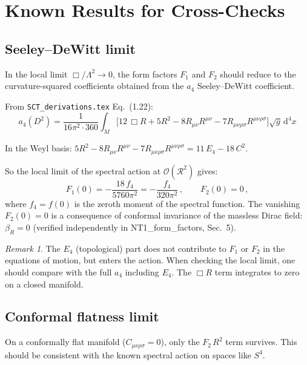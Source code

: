 \documentclass[12pt,a4paper]{article}
\theoremstyle{definition}
\theoremstyle{remark}
\newtheorem{remark}[proposition]{Remark}
\newcommand{\Rsq}{R_{\mu\nu\rho\sigma}R^{\mu\nu\rho\sigma}}
\newcommand{\Ricsq}{R_{\mu\nu}R^{\mu\nu}}
\newcommand{\dd}{\mathrm{d}}
\begin{document}
\section{Known Results for Cross-Checks}
\label{sec:cross-checks}

\subsection{Seeley--DeWitt limit}

In the local limit $\Box/\Lambda^2 \to 0$, the form factors $F_1$ and
$F_2$ should reduce to the curvature-squared coefficients obtained
from the $a_4$ Seeley--DeWitt coefficient.

From \texttt{SCT\_derivations.tex} Eq.~(1.22):
\begin{equation}
  a_4(D^2) = \frac{1}{16\pi^2\cdot 360}\int_M\bigl[
  12\,\Box R + 5R^2 - 8\Ricsq - 7\Rsq
  \bigr]\sqrt{g}\,\dd^4x
  \label{eq:a4-check}
\end{equation}

In the Weyl basis: $5R^2 - 8\Ricsq - 7\Rsq = 11\,E_4 - 18\,C^2$.

So the local limit of the spectral action at $\mathcal{O}(\mathcal{R}^2)$ gives:
\begin{equation}
  F_1(0) = -\frac{18\,f_4}{5760\pi^2} = -\frac{f_4}{320\pi^2}\,,
  \qquad
  F_2(0) = 0\,,
  \label{eq:local-check}
\end{equation}
where $f_4 = f(0)$ is the zeroth moment of the spectral function.
The vanishing $F_2(0) = 0$ is a consequence of conformal invariance of the
massless Dirac field: $\beta_R = 0$ (verified independently in
NT1\_form\_factors, Sec.~5).

\begin{remark}
The $E_4$ (topological) part does not contribute to $F_1$ or $F_2$
in the equations of motion, but enters the action.  When checking
the local limit, one should compare with the full $a_4$ including
$E_4$.  The $\Box R$ term integrates to zero on a closed manifold.
\end{remark}


\subsection{Conformal flatness limit}

On a conformally flat manifold ($C_{\mu\nu\rho\sigma}=0$), only
the $F_2\,R^2$ term survives.  This should be consistent with the
known spectral action on spaces like $S^4$.
\end{document}
